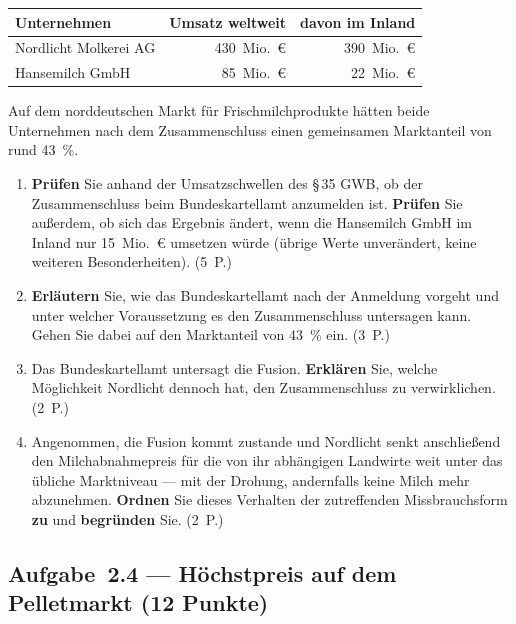 \begin{center}
\begin{tabular}{l r r}
\toprule
\rowcolor{bfwTabHead} \textbf{Unternehmen} & \textbf{Umsatz weltweit} & \textbf{davon im Inland}\\
\midrule
Nordlicht Molkerei AG & 430~Mio.~€ & 390~Mio.~€\\
Hansemilch GmbH & 85~Mio.~€ & 22~Mio.~€\\
\bottomrule
\end{tabular}
\end{center}

\noindent Auf dem norddeutschen Markt für Frischmilchprodukte hätten beide Unternehmen
nach dem Zusammenschluss einen gemeinsamen Marktanteil von rund 43~\%.

\begin{enumerate}[label=\alph*)]
  \item \textbf{Prüfen} Sie anhand der Umsatzschwellen des \S\,35 GWB, ob der Zusammenschluss
    beim Bundeskartellamt anzumelden ist. \textbf{Prüfen} Sie außerdem, ob sich das Ergebnis
    ändert, wenn die Hansemilch GmbH im Inland nur 15~Mio.~€ umsetzen würde (übrige Werte
    unverändert, keine weiteren Besonderheiten). \hfill (5~P.)
  \item \textbf{Erläutern} Sie, wie das Bundeskartellamt nach der Anmeldung vorgeht und
    unter welcher Voraussetzung es den Zusammenschluss untersagen kann. Gehen Sie dabei auf
    den Marktanteil von 43~\% ein. \hfill (3~P.)
  \item Das Bundeskartellamt untersagt die Fusion. \textbf{Erklären} Sie, welche Möglichkeit
    Nordlicht dennoch hat, den Zusammenschluss zu verwirklichen. \hfill (2~P.)
  \item Angenommen, die Fusion kommt zustande und Nordlicht senkt anschließend den
    Milchabnahmepreis für die von ihr abhängigen Landwirte weit unter das übliche
    Marktniveau --- mit der Drohung, andernfalls keine Milch mehr abzunehmen.
    \textbf{Ordnen} Sie dieses Verhalten der zutreffenden Missbrauchsform \textbf{zu} und
    \textbf{begründen} Sie. \hfill (2~P.)
\end{enumerate}

\subsection*{Aufgabe~2.4 --- Höchstpreis auf dem Pelletmarkt (12 Punkte)}

